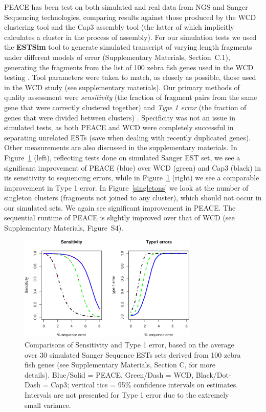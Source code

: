 \documentclass[a4,center,fleqn]{NAR}
\newcommand{\peace} {{\small PEACE}}
\newcommand{\wcd} {{\small WCD}}
\newcommand{\capthree} {{\small Cap3}}
\begin{document}
\peace\/ has been test on both simulated and real data from NGS and
Sanger Sequencing technologies, comparing results against those
produced by the \wcd\/ clustering tool \cite{Hazelhurst08a} and the
\capthree\/ assembly tool \cite{Huang99} (the latter of which
implicitly calculates a cluster in the process of assembly).  For our
simulation tests we used the {\bf ESTSim} tool \cite{Hazelhurst03} to
generate simulated transcript of varying length fragments under
different models of error (Supplementary Materials, Section~C.1),
generating the fragments from the list of 100 zebra fish genes used in
the \wcd\/ testing \cite{Hazelhurst08a}.  Tool parameters were taken
to match, as closely as possible, those used in the \wcd\/ study (see
supplementary materials).  Our primary methods of quality assessment
were {\it sensitivity} (the fraction of fragment pairs from the same
gene that were correctly clustered together) and {\it Type 1 error}
(the fraction of genes that were divided between clusters)
\cite{Wang04,Hazelhurst08a}.  Specificity was not an issue in
simulated tests, as both \peace\/ and \wcd\/ were completely successful
in separating unrelated ESTs (save when dealing with recently
duplicated genes).  Other measurements are also discussed in the
supplementary materials.  In Figure~\ref{SeT1} (left), reflecting
tests done on simulated Sanger EST set, we see a
significant improvement of \peace\/ (blue) over \wcd\/ (green) and
\capthree\/ (black) in its sensitivity to sequencing errors, while in
Figure~\ref{SeT1} (right) we see a comparable improvement in Type 1
error.  In Figure~\ref{singletons} we look at the number of singleton
clusters (fragments not joined to any cluster), which should not occur
in our simulated sets.  We again see significant improvement in \peace.
The sequential runtime of \peace\/ is slightly improved over that of
\wcd\/ (see Supplementary Materials, Figure~S4).

\begin{figure}
  \centerline{\includegraphics[width=3.35in]{pics.d/SeT1.pdf}}
  \caption{Comparisons of Sensitivity and Type 1 error, based on the
    average over 30 simulated Sanger Sequence ESTs sets derived from 100 zebra
    fish genes  (see
    Supplementary Materials, Section C, for more details).  Blue/Solid
    = \peace, Green/Dash = \wcd, Black/Dot-Dash = \capthree; vertical
    tics = 95\% confidence intervals on estimates.  Intervals are not
    presented for Type 1 error due to the extremely small
    variance.}\label{SeT1}
\end{figure}
\end{document}
